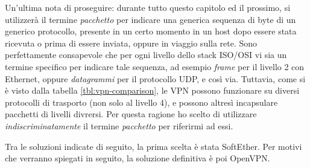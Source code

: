 Un'ultima nota di proseguire: durante tutto questo capitolo ed il prossimo, si utilizzerà
il termine \textit{pacchetto} per indicare una generica sequenza di byte di un generico
protocollo, presente in un certo momento in un host dopo essere stata ricevuta o prima
di essere inviata, oppure in viaggio sulla rete. Sono perfettamente consapevole che per
ogni livello dello stack ISO/OSI vi sia un termine specifico per indicare tale
sequenza, ad esempio \textit{frame} per il livello 2 con Ethernet, oppure \textit{datagrammi}
per il protocollo UDP, e così via. Tuttavia, come si è visto dalla tabella \ref{tbl:vpn-comparison},
le VPN possono funzionare su diversi protocolli di trasporto (non solo al livello 4),
e possono altresì incapsulare
pacchetti di livelli divrersi. Per questa ragione ho scelto di utilizzare
\textit{indiscriminatamente} il termine \textit{pacchetto} per riferirmi ad essi.


Tra le soluzioni indicate di seguito, la prima scelta è stata SoftEther. Per motivi che
verranno spiegati in seguito, la soluzione definitiva è poi OpenVPN.
